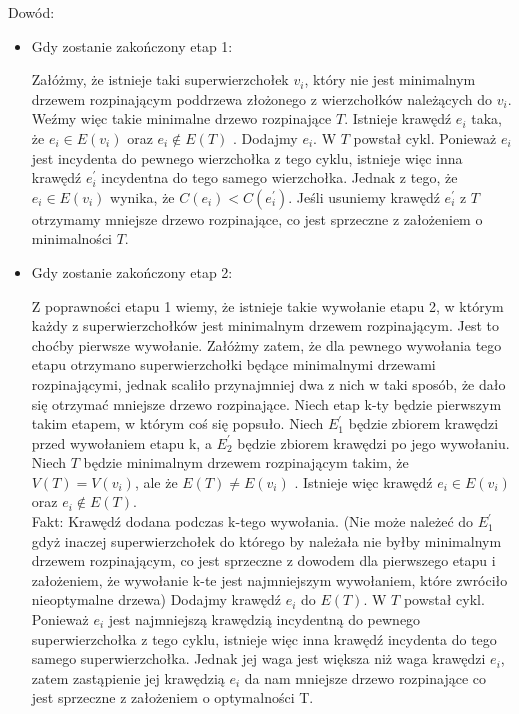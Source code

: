\noindent Dowód:

\begin{itemize}
\item Gdy zostanie zakończony etap 1:

Załóżmy, że istnieje taki superwierzchołek $v_i$, który nie jest minimalnym drzewem rozpinającym poddrzewa złożonego z wierzchołków należących do $v_i$. Weźmy więc takie minimalne drzewo rozpinające $T$. Istnieje krawędź $e_i$ taka, że $e_i \in E(v_i)$ oraz $e_i \not\in E(T)$ . Dodajmy $e_i$. W $T$ powstał cykl. Ponieważ $e_i$ jest incydenta do pewnego wierzchołka z tego cyklu, istnieje więc inna krawędź $e^\prime_i$ incydentna do tego samego wierzchołka. Jednak z tego, że $e_i \in E(v_i)$ wynika, że $C(e_i) < C(e^\prime_i)$. Jeśli usuniemy krawędź $e^\prime_i$ z $T$ otrzymamy mniejsze drzewo rozpinające, co jest sprzeczne z założeniem o minimalności $T$.

\item Gdy zostanie zakończony etap 2:

Z poprawności etapu 1 wiemy, że istnieje takie wywołanie etapu 2, w którym każdy z superwierzchołków jest minimalnym drzewem rozpinającym. Jest to choćby pierwsze wywołanie. Załóżmy zatem, że dla pewnego wywołania tego etapu otrzymano superwierzchołki będące minimalnymi drzewami rozpinającymi, jednak scaliło przynajmniej dwa z nich w taki sposób, że dało się otrzymać mniejsze drzewo rozpinające. Niech etap k-ty będzie pierwszym takim etapem, w którym coś się popsuło. Niech $E^\prime_1$ będzie zbiorem krawędzi przed wywołaniem etapu k, a $E^\prime_2$ będzie zbiorem krawędzi po jego wywołaniu. Niech $T$ będzie minimalnym drzewem rozpinającym takim, że $V(T) = V(v_i)$, ale że $E(T) \neq E(v_i)$ . Istnieje więc krawędź $e_i \in E(v_i)$ oraz $e_i \not\in E(T)$.\\

Fakt: Krawędź  dodana podczas k-tego wywołania. (Nie może należeć do $E^\prime_1$ gdyż inaczej superwierzchołek do którego by należała nie byłby minimalnym drzewem rozpinającym, co jest sprzeczne z dowodem dla pierwszego etapu i założeniem, że wywołanie k-te jest najmniejszym wywołaniem, które zwróciło nieoptymalne drzewa)
Dodajmy krawędź $e_i$ do $E(T)$. W $T$ powstał cykl. Ponieważ $e_i$ jest najmniejszą krawędzią incydentną do pewnego superwierzchołka z tego cyklu, istnieje więc inna krawędź incydenta do tego samego superwierzchołka. Jednak jej waga jest większa niż waga krawędzi $e_i$, zatem zastąpienie jej krawędzią $e_i$ da nam mniejsze drzewo rozpinające co jest sprzeczne z założeniem o optymalności T.
\end{itemize}


\section{} %
\section{} %
